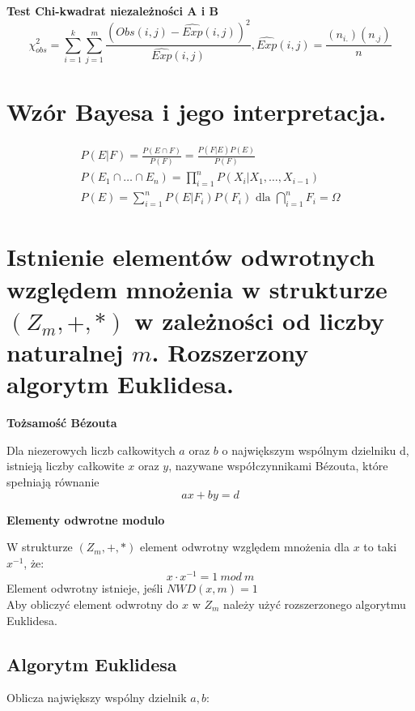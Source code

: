 \documentclass[main.tex]{subfiles}
\begin{document}
    \textbf{Test Chi-kwadrat niezależności A i B}
    \begin{equation*}
        \chi_{obs}^2 = \sum_{i=1}^k \sum_{j=1}^m \frac{(Obs(i,j) - \hat{Exp}(i,j))^2}{\hat{Exp}(i,j)}, \hat{Exp}(i,j) = \frac{(n_{i.})(n_{.j})}{n}
    \end{equation*}


    \section{Wzór Bayesa i jego interpretacja.}


    \begin{gather*}
        P(E|F) = \frac{P(E \cap F)}{P(F)} = \frac{P(F|E) P(E)}{P(F)} \\
        P(E_1 \cap \dots \cap E_n) = \prod_{i=1}^{n} P(X_i | X_1, \dots, X_{i-1}) \\
        P(E) = \sum_{i=1}^{n} P(E|F_i)P(F_i) \text{ dla } \bigcap_{i=1}^{n} F_i = \Omega
    \end{gather*}




    \section{Istnienie elementów odwrotnych względem mnożenia w strukturze $(Z_m, +, *)$ w zależności od liczby
    naturalnej $m$. Rozszerzony algorytm Euklidesa.}

    \begin{theorem}
        \textbf{Tożsamość Bézouta}

        Dla niezerowych liczb całkowitych $a$ oraz $b$ o największym wspólnym dzielniku d, istnieją liczby całkowite $x$ oraz $y$, nazywane współczynnikami Bézouta, które spełniają równanie
        \[ax + by = d\]
    \end{theorem}

    \begin{definition}
        \textbf{Elementy odwrotne modulo}

        W strukturze $(Z_m, +, *)$ element odwrotny względem mnożenia dla $x$ to taki $x^{-1}$, że:
        \[ x \cdot x^{-1} = 1 \  mod \  m \]
        Element odwrotny istnieje, jeśli $NWD(x, m) = 1$\\


        Aby obliczyć element odwrotny do $x$ w $Z_{m}$ należy użyć rozszerzonego algorytmu Euklidesa.
    \end{definition}
    \subsection{Algorytm Euklidesa}
    Oblicza największy wspólny dzielnik $a, b$:
\end{document}
